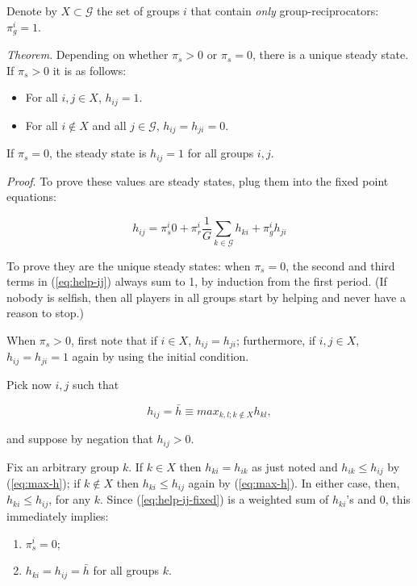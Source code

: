 \documentclass[
]{article}
\providecommand{\tightlist}{%
  \setlength{\itemsep}{0pt}\setlength{\parskip}{0pt}}
\begin{document}
Denote by \(X \subset \mathcal{G}\) the set of groups \(i\) that contain
\emph{only} group-reciprocators: \(\pi^i_g = 1\).

\emph{Theorem}. Depending on whether \(\pi_s > 0\) or \(\pi_s = 0\),
there is a unique steady state. If \(\pi_s > 0\) it is as follows:

\begin{itemize}
\tightlist
\item
  For all \(i, j \in X\), \(h_{ij} = 1\).
\item
  For all \(i \notin X\) and all \(j \in \mathcal{G}\),
  \(h_{ij} = h_{ji} = 0\).
\end{itemize}

If \(\pi_s = 0\), the steady state is \(h_{ij} = 1\) for all groups
\(i, j\).

\emph{Proof}. To prove these values are steady states, plug them into
the fixed point equations:

\begin{equation}
h_{ij} = \pi^i_s0  
      + \pi^i_r \frac{1}{G}\sum_{k \in \mathcal{G}} h_{ki} 
      + \pi^i_g h_{ji}
\label{eq:help-ij-fixed}
\end{equation}

To prove they are the unique steady states: when \(\pi_s = 0\), the
second and third terms in (\ref{eq:help-ij}) always sum to 1, by
induction from the first period. (If nobody is selfish, then all players
in all groups start by helping and never have a reason to stop.)

When \(\pi_s > 0\), first note that if \(i \in X\), \(h_{ij} = h_{ji}\);
furthermore, if \(i,j \in X\), \(h_{ij} = h_{ji} = 1\) again by using
the initial condition.

Pick now \(i,j\) such that

\begin{equation}
h_{ij} = \bar{h} \equiv max_{k,l; k \notin X} h_{kl},
\label{eq:max-h}
\end{equation}

and suppose by negation that \(h_{ij} > 0\).

Fix an arbitrary group \(k\). If \(k \in X\) then \(h_{ki} = h_{ik}\) as
just noted and \(h_{ik} \le h_{ij}\) by (\ref{eq:max-h}); if
\(k \notin X\) then \(h_{ki} \le h_{ij}\) again by (\ref{eq:max-h}). In
either case, then, \(h_{ki} \le h_{ij}\), for any \(k\). Since
(\ref{eq:help-ij-fixed}) is a weighted sum of \(h_{ki}\)'s and 0, this
immediately implies:

\begin{enumerate}
\def\labelenumi{\arabic{enumi}.}
\tightlist
\item
  \(\pi^i_s = 0\);
\item
  \(h_{ki} = h_{ij} = \bar{h}\) for all groups \(k\).
\end{enumerate}
\end{document}
